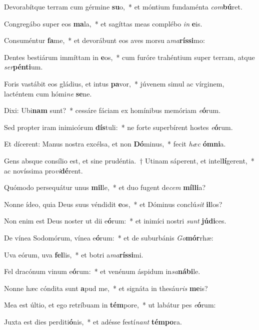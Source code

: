 \item Devorabítque terram cum gérmine \textbf{su}o,~* et móntium fundaménta \textit{com}\textbf{bú}ret.
\item Congregábo super eos \textbf{ma}la,~* et sagíttas meas complébo \textit{in} \textbf{e}is.
\item Consuméntur \textbf{fa}me,~* et devorábunt eos aves morsu a\textit{ma}\textbf{rís}\textbf{si}mo:
\item Dentes bestiárum immíttam in \textbf{e}os,~* cum furóre trahéntium super terram, atque \textit{ser}\textbf{pén}\textbf{ti}um.
\item Foris vastábit eos gládius, et intus \textbf{pa}vor,~* júvenem simul ac vírginem, lacténtem cum hómi\textit{ne} \textbf{se}ne.
\item Dixi: Ubi\textbf{nam} sunt?~* cessáre fáciam ex homínibus memóriam \textit{e}\textbf{ó}rum.
\item Sed propter iram inimicórum \textbf{dís}tuli:~* ne forte superbírent hostes \textit{e}\textbf{ó}rum.
\item Et dícerent: Manus nostra excélsa, et non \textbf{Dó}minus,~* fecit \textit{hæc} \textbf{óm}\textbf{ni}a.
\item Gens absque consílio est, et sine prudéntia.~† Utinam sáperent, et intel\textbf{lí}gerent,~* ac novíssima pro\textit{vi}\textbf{dé}rent.
\item Quómodo persequátur unus \textbf{mil}le,~* et duo fugent de\textit{cem} \textbf{míl}\textbf{li}a?
\item Nonne ídeo, quia Deus suus véndidit \textbf{e}os,~* et Dóminus conclú\textit{sit} \textbf{il}los?
\item Non enim est Deus noster ut dii e\textbf{ó}rum:~* et inimíci nostri \textit{sunt} \textbf{jú}\textbf{di}ces.
\item De vínea Sodomórum, vínea e\textbf{ó}rum:~* et de suburbánis \textit{Go}\textbf{mór}rhæ:
\item Uva eórum, uva \textbf{fel}lis,~* et botri a\textit{ma}\textbf{rís}\textbf{si}mi.
\item Fel dracónum vinum e\textbf{ó}rum:~* et venénum áspidum in\textit{sa}\textbf{ná}\textbf{bi}le.
\item Nonne hæc cóndita sunt \textbf{a}pud me,~* et signáta in thesáu\textit{ris} \textbf{me}is?
\item Mea est últio, et ego retríbuam in \textbf{tém}pore,~* ut labátur pes \textit{e}\textbf{ó}rum:
\item Juxta est dies perditi\textbf{ó}nis,~* et adésse festí\textit{nant} \textbf{tém}\textbf{po}ra.
